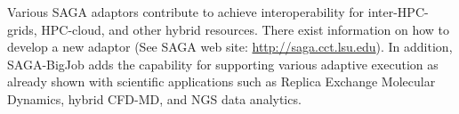 \documentclass[]{article}
\begin{document}
Various SAGA adaptors contribute to achieve interoperability for
inter-HPC-grids, HPC-cloud, and other hybrid resources.  There exist
information on how to develop a new adaptor (See SAGA web site:
\url{http://saga.cct.lsu.edu}). In addition, SAGA-BigJob adds the
capability for supporting various adaptive execution as already shown
with scientific applications such as Replica Exchange Molecular
Dynamics, hybrid CFD-MD, and NGS data
analytics\cite{saga-royalsoc,coupled,ecmls11}.

\end{document}
